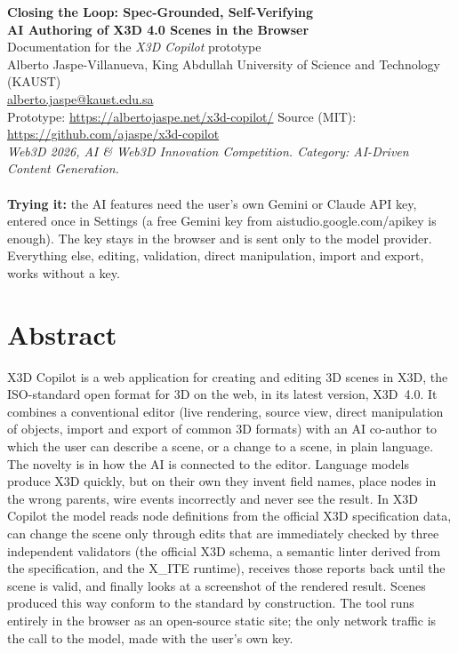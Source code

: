 \documentclass[10pt,a4paper]{article}
\begin{document}
\begin{center}
{\LARGE\bfseries Closing the Loop: Spec-Grounded, Self-Verifying}\\[1pt]
{\LARGE\bfseries AI Authoring of X3D 4.0 Scenes in the Browser}\\[5pt]
{\normalsize Documentation for the \emph{X3D Copilot} prototype}\\[4pt]
Alberto Jaspe-Villanueva, King Abdullah University of Science and Technology (KAUST)\\
\href{mailto:alberto.jaspe@kaust.edu.sa}{alberto.jaspe@kaust.edu.sa}\\[3pt]
\small Prototype: \url{https://albertojaspe.net/x3d-copilot/} \qquad Source (MIT): \url{https://github.com/ajaspe/x3d-copilot}\\
\small\textit{Web3D 2026, AI \& Web3D Innovation Competition. Category: AI-Driven Content Generation.}\\[8pt]
\\[8pt]
\small\textbf{Trying it:} the AI features need the user's own Gemini or Claude API key, entered once in \textsf{Settings} (a free Gemini key from aistudio.google.com/apikey is enough). The key stays in the browser and is sent only to the model provider. Everything else, editing, validation, direct manipulation, import and export, works without a key.
\end{center}

\vspace{6pt}
\section{Abstract}
X3D Copilot is a web application for creating and editing 3D scenes in X3D, the ISO-standard open format for 3D on the web, in its latest version, X3D~4.0. It combines a conventional editor (live rendering, source view, direct manipulation of objects, import and export of common 3D formats) with an AI co-author to which the user can describe a scene, or a change to a scene, in plain language. The novelty is in how the AI is connected to the editor. Language models produce X3D quickly, but on their own they invent field names, place nodes in the wrong parents, wire events incorrectly and never see the result. In X3D Copilot the model reads node definitions from the official X3D specification data, can change the scene only through edits that are immediately checked by three independent validators (the official X3D schema, a semantic linter derived from the specification, and the X\_ITE runtime), receives those reports back until the scene is valid, and finally looks at a screenshot of the rendered result. Scenes produced this way conform to the standard by construction. The tool runs entirely in the browser as an open-source static site; the only network traffic is the call to the model, made with the user's own key.
\end{document}
